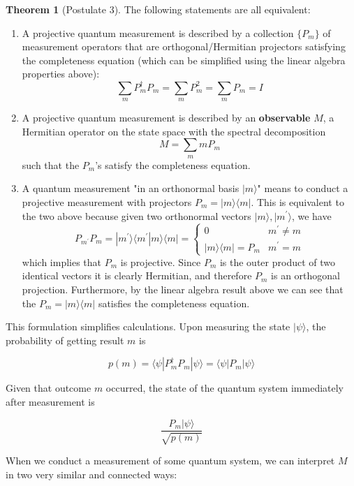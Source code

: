 \documentclass{article}
\theoremstyle{definition}
\newtheorem{theorem}{Theorem}[section]
\begin{document}
    \begin{theorem}[Postulate 3]
      The following statements are all equivalent:

      \begin{enumerate}
        \item A projective quantum measurement is described by a collection $\{P_m\}$ of measurement operators that are orthogonal/Hermitian projectors satisfying the completeness equation (which can be simplified using the linear algebra properties above):
          \[\sum_m P_m^\dagger P_m = \sum_m P_m^2 = \sum_m P_m = I\]
        \item A projective quantum measurement is described by an \textbf{observable} $M$, a Hermitian operator on the state space with the spectral decomposition
          \[M = \sum_m m P_m\]
        such that the $P_m$'s satisfy the completeness equation.
        \item A quantum measurement "in an orthonormal basis $|m\rangle$" means to conduct a projective measurement with projectors $P_m = |m \rangle \langle m |$. This is equivalent to the two above because given two orthonormal vectors $|m\rangle, |m^\prime \rangle$, we have
          \[P_{m^\prime} P_m = |m^\prime \rangle \langle m^\prime | m \rangle \langle m | = \begin{cases} 0 & m^\prime \neq m \\ |m \rangle \langle m | = P_m & m^\prime = m \end{cases}\]
        which implies that $P_m$ is projective. Since $P_m$ is the outer product of two identical vectors it is clearly Hermitian, and therefore $P_m$ is an orthogonal projection. Furthermore, by the linear algebra result above we can see that the $P_m = |m\rangle \langle m|$ satisfies the completeness equation.
      \end{enumerate}
    \end{theorem}

    This formulation simplifies calculations. Upon measuring the state $|\psi\rangle$, the probability of getting result $m$ is

      \[p(m) = \langle \psi | P_m^\dagger P_m | \psi \rangle = \langle \psi | P_m | \psi \rangle\]

    Given that outcome $m$ occurred, the state of the quantum system immediately after measurement is

      \[\frac{P_m |\psi \rangle}{\sqrt{ p(m)}}\]

    When we conduct a measurement of some quantum system, we can interpret $M$ in two very similar and connected ways:
\end{document}

